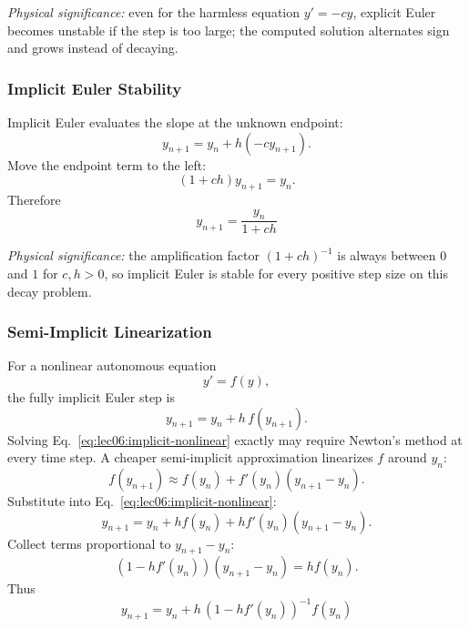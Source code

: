 \textit{Physical significance:} even for the harmless equation
$y'=-cy$, explicit Euler becomes unstable if the step is too large; the
computed solution alternates sign and grows instead of decaying.

\subsubsection{Implicit Euler Stability}
Implicit Euler evaluates the slope at the unknown endpoint:
\begin{equation}
    y_{n+1}=y_n+h(-c y_{n+1}).
    \label{eq:lec06:implicit-euler-start}
\end{equation}
Move the endpoint term to the left:
\begin{equation}
    (1+ch)y_{n+1}=y_n.
    \label{eq:lec06:implicit-euler-solve}
\end{equation}
Therefore
\begin{equation}
    \boxed{
    y_{n+1}=\frac{y_n}{1+ch}}
    \label{eq:lec06:implicit-euler-result}
\end{equation}

\textit{Physical significance:} the amplification factor
$(1+ch)^{-1}$ is always between $0$ and $1$ for $c,h>0$, so implicit Euler is
stable for every positive step size on this decay problem.

\subsubsection{Semi-Implicit Linearization}
For a nonlinear autonomous equation
\begin{equation}
    y'=f(y),
    \label{eq:lec06:autonomous-nonlinear}
\end{equation}
the fully implicit Euler step is
\begin{equation}
    y_{n+1}=y_n+h\,f(y_{n+1}).
    \label{eq:lec06:implicit-nonlinear}
\end{equation}
Solving Eq.~\eqref{eq:lec06:implicit-nonlinear} exactly may require Newton's
method at every time step. A cheaper semi-implicit approximation linearizes
$f$ around $y_n$:
\begin{equation}
    f(y_{n+1})
    \approx f(y_n)+f'(y_n)(y_{n+1}-y_n).
    \label{eq:lec06:semi-linearization}
\end{equation}
Substitute into Eq.~\eqref{eq:lec06:implicit-nonlinear}:
\begin{equation}
    y_{n+1}
    =y_n+h f(y_n)+h f'(y_n)(y_{n+1}-y_n).
    \label{eq:lec06:semi-start}
\end{equation}
Collect terms proportional to $y_{n+1}-y_n$:
\begin{equation}
    \left(1-h f'(y_n)\right)(y_{n+1}-y_n)=h f(y_n).
    \label{eq:lec06:semi-solve}
\end{equation}
Thus
\begin{equation}
    \boxed{
    y_{n+1}
    =y_n+h\,\left(1-h f'(y_n)\right)^{-1}f(y_n)}
    \label{eq:lec06:semi-result}
\end{equation}

